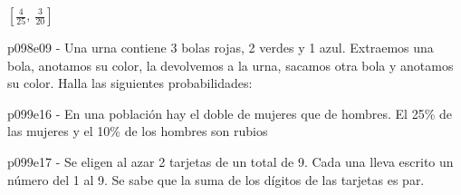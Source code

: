 \documentclass[spanish, 11pt]{exam}
\begin{document}
\begin{questions}
\begin{multicols}{2}
\begin{parts}
  \begin{solution}  $ \left[ \frac{4}{25}, \  \frac{3}{20}\right] $  \end{solution}
        \end{parts}
        \end{multicols}
        \question p098e09 - Una urna contiene 3 bolas rojas, 2 verdes y 1 azul. Extraemos una bola, anotamos su color, la devolvemos a
la urna, sacamos otra bola y anotamos su color. Halla las siguientes probabilidades:
        \begin{multicols}{2}
        \end{multicols}
        \question p099e16 - En una población hay el doble de mujeres que de hombres. 
El 25\% de las mujeres y el  10\% de los hombres
son rubios

        \begin{multicols}{2}
        \end{multicols}
        \question p099e17 - Se eligen al azar 2 tarjetas de un total de 9. Cada una lleva escrito un número del 1 al 9. Se sabe que la suma
de los dígitos de las tarjetas es par.


\end{questions}
\end{document}

